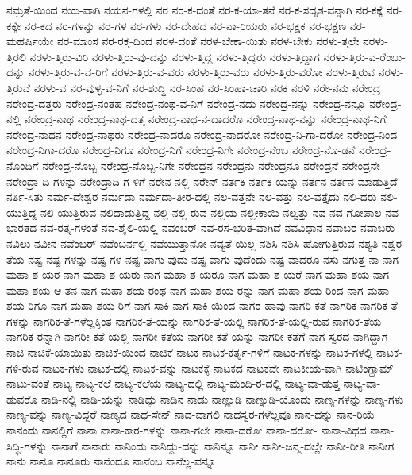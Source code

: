{ನಮ್ರತೆ-ಯಿಂದ
ನಯ-ವಾಗಿ
ನಯನ-ಗಳಲ್ಲಿ
ನರ
ನರ-ಕ-ದಂತೆ
ನರ-ಕ-ಯಾ-ತನೆ
ನರ-ಕ-ಸದೃಶ-ವನ್ನಾಗಿ
ನರ-ಕಕ್ಕೆ
ನರ-ಕಕ್ಕೇ
ನರ-ಕದ
ನರ-ಗಳನ್ನು
ನರ-ಗಳ
ನರ-ಗಳು
ನರ-ದೇಹದ
ನರ-ನಾ-ರಿಯರು
ನರ-ಭಕ್ಷಕ
ನರ-ಭಕ್ಷಣ
ನರ-ಮಹರ್ಷಿಯೇ
ನರ-ಮಾಂಸ
ನರ-ರಕ್ತ-ದಿಂದ
ನರಳ-ದಂತೆ
ನರಳ-ಬೇಕಾ-ಯಿತು
ನರಳ-ಬೇಕು
ನರಳು-ತ್ತಲೇ
ನರಳು-ತ್ತಿರಲಿ
ನರಳು-ತ್ತಿರು-ವಿರಿ
ನರಳು-ತ್ತಿರು-ವು-ದನ್ನು
ನರಳು-ತ್ತಿದ್ದ
ನರಳು-ತ್ತಿದ್ದರು
ನರಳು-ತ್ತಿದ್ದಾಗ
ನರಳು-ತ್ತಿರು-ವ-ರೆಂಬು-ದನ್ನು
ನರಳು-ತ್ತಿರು-ವ-ವ-ರಿಗೆ
ನರಳು-ತ್ತಿರು-ವ-ವರು
ನರಳು-ತ್ತಿರು-ವರು
ನರಳು-ತ್ತಿರು-ವರೋ
ನರಳು-ತ್ತಿರುವ
ನರಳು-ತ್ತಿರುವೆ
ನರಳು-ವ
ನರ-ವುಳ್ಳ-ವ-ನಿಗೆ
ನರ-ಶುದ್ಧಿ
ನರ-ಸಿಂಹ
ನರ-ಸಿಂಹಾ-ಚಾರಿ
ನರಕ
ನರಳಿ
ನರೇ-ನನು
ನರೇಂದ್ರ
ನರೇಂದ್ರ-ದತ್ತರು
ನರೇಂದ್ರ-ನಂತಹ
ನರೇಂದ್ರ-ನಂಥ-ವ-ನಿಗೆ
ನರೇಂದ್ರ-ನದು
ನರೇಂದ್ರ-ನನ್ನು
ನರೇಂದ್ರ-ನನ್ನೂ
ನರೇಂದ್ರ-ನಲ್ಲಿ
ನರೇಂದ್ರ-ನಾಥ
ನರೇಂದ್ರ-ನಾಥ-ದತ್ತ
ನರೇಂದ್ರ-ನಾಥ-ನ-ದಾದರೊ
ನರೇಂದ್ರ-ನಾಥ-ನನ್ನು
ನರೇಂದ್ರ-ನಾಥ-ನಿಗೆ
ನರೇಂದ್ರ-ನಾಥನ
ನರೇಂದ್ರ-ನಾಥರು
ನರೇಂದ್ರ-ನಾದರೊ
ನರೇಂದ್ರ-ನಾದರೋ
ನರೇಂದ್ರ-ನಿ-ಗಾ-ದರೋ
ನರೇಂದ್ರ-ನಿಂದ
ನರೇಂದ್ರ-ನಿಗಾ-ದರೊ
ನರೇಂದ್ರ-ನಿಗೂ
ನರೇಂದ್ರ-ನಿಗೆ
ನರೇಂದ್ರ-ನಿಗೇ
ನರೇಂದ್ರ-ನೆಂಬ
ನರೇಂದ್ರ-ನೊ-ಡನೆ
ನರೇಂದ್ರ-ನೊಂದಿಗೆ
ನರೇಂದ್ರ-ನೊಬ್ಬ
ನರೇಂದ್ರ-ನೊಬ್ಬ-ನಿಗೇ
ನರೇಂದ್ರನ
ನರೇಂದ್ರನು
ನರೇಂದ್ರನೂ
ನರೇಂದ್ರನೆ
ನರೇಂದ್ರನೇ
ನರೇಂದ್ರಾ-ದಿ-ಗಳನ್ನು
ನರೇಂದ್ರಾದಿ-ಗ-ಳಿಗೆ
ನರೇನ-ನಲ್ಲಿ
ನರೇನ್
ನರ್ತಕಿ
ನರ್ತಕಿ-ಯನ್ನು
ನರ್ತನ
ನರ್ತನ-ಮಾಡುತ್ತಿದೆ
ನರ್ತಿ-ಸಿತು
ನರ್ಮ-ದೇಶ್ವರ
ನರ್ಮದಾ
ನರ್ಮದಾ-ತೀರ-ದಲ್ಲಿ
ನಲ-ವತ್ತನೇ
ನಲ-ವತ್ತು
ನಲ-ವತ್ತೈದು
ನಲಿ-ದರು
ನಲಿ-ಯುತ್ತಿದ್ದ
ನಲಿ-ಯುತ್ತಿರುವ
ನಲಿದಾಡುತ್ತಿದ್ದ
ನಲ್ಲಿ
ನಲ್ಲಿ-ರುವ
ನಲ್ಲಿಯ
ನಲ್ಲೀಕಾಯಿ
ನಲ್ವತ್ತು
ನವ
ನವ-ಗೋಪಾಲ
ನವ-ಭಾರತದ
ನವ-ರತ್ನ-ಗಳಂತೆ
ನವ-ಶೈಲಿ-ಯಲ್ಲಿ
ನವಂಬರ್
ನವ-ರಸ-ಭರಿತ-ವಾಗಿದೆ
ನವವಿಧಾನ
ನವಾಬರ
ನವಾಬರು
ನವಿಲು
ನವೀನ
ನವೆಂಬರ್
ನವೆಂಬರ್ನಲ್ಲಿ
ನವೆಯುತ್ತಾನೋ
ನವ್ಯತೆ-ಯಿಲ್ಲ
ನಶಿಸಿ
ನಶಿಸಿ-ಹೋಗುತ್ತಿರುವ
ನಶ್ಯತಿ
ನಶ್ವರ-ತೆಯ
ನಷ್ಟ
ನಷ್ಟ-ಗಳನ್ನು
ನಷ್ಟ-ಗಳ
ನಷ್ಟ-ವಾಗು-ವುದು
ನಷ್ಟ-ವಾಗು-ವುದೆಂದು
ನಷ್ಟ-ವಾದರೂ
ನಸು-ನಗುತ್ತ
ನಾ
ನಾಗ-ಮಹಾ-ಶ-ಯರ
ನಾಗ-ಮಹಾ-ಶ-ಯರು
ನಾಗ-ಮಹಾ-ಶ-ಯರೂ
ನಾಗ-ಮಹಾ-ಶ-ಯರೆ
ನಾಗ-ಮಹಾ-ಶಯ
ನಾಗ-ಮಹಾ-ಶಯ-ಆ-ತನ
ನಾಗ-ಮಹಾ-ಶಯ-ರಂಥ
ನಾಗ-ಮಹಾ-ಶಯ-ರನ್ನು
ನಾಗ-ಮಹಾ-ಶಯ-ರಿಂದ
ನಾಗ-ಮಹಾ-ಶಯ-ರಿಗೂ
ನಾಗ-ಮಹಾ-ಶಯ-ರಿಗೆ
ನಾಗ-ಸಾಕಿ
ನಾಗ-ಸಾಕಿ-ಯಿಂದ
ನಾಗರ-ಹಾವು
ನಾಗರಿ-ಕತೆ
ನಾಗರಿಕ
ನಾಗರಿಕ-ತೆ-ಗಳನ್ನು
ನಾಗರಿಕ-ತೆ-ಗಳೆಲ್ಲಕ್ಕಿಂತ
ನಾಗರಿಕ-ತೆ-ಯನ್ನು
ನಾಗರಿಕ-ತೆ-ಯಲ್ಲಿ
ನಾಗರಿಕ-ತೆ-ಯಲ್ಲಿ-ರುವ
ನಾಗರಿಕ-ತೆಯ
ನಾಗರಿಕ-ರನ್ನಾಗಿ
ನಾಗರೀ-ಕತೆ-ಯಲ್ಲಿ
ನಾಗರೀ-ಕತೆಯ
ನಾಗರೀ-ಕತೆ-ಯನ್ನು
ನಾಗರೀ-ಕತೆಗೆ
ನಾಗ-ಸ್ವರದ
ನಾಗಿದ್ದಾಗ
ನಾಚಿ
ನಾಚಿಕೆ-ಯಾಯಿತು
ನಾಚಿಕೆ-ಯಿಂದ
ನಾಚಿಕೆ
ನಾಟಕ
ನಾಟಕ-ಕರ್ತೃ-ಗಳಿಗೆ
ನಾಟಕ-ಗಳನ್ನು
ನಾಟಕ-ಗಳಲ್ಲಿ
ನಾಟಕ-ಗಳಿ-ರುವ
ನಾಟಕ-ಗಳು
ನಾಟಕ-ದಲ್ಲಿ
ನಾಟಕ-ವನ್ನು
ನಾಟಕಕ್ಕೆ
ನಾಟಕದ
ನಾಟಕವೇ
ನಾಟಕೀಯ-ವಾಗಿ
ನಾಟಿಂಗ್ಹಾಮ್
ನಾಟು-ವಂತೆ
ನಾಟ್ಯ
ನಾಟ್ಯ-ಕಲೆ
ನಾಟ್ಯ-ಕಲೆಯ
ನಾಟ್ಯ-ದಲ್ಲಿ
ನಾಟ್ಯ-ಮಂದಿ-ರ-ದಲ್ಲಿ
ನಾಟ್ಯ-ವಾ-ಡುತ್ತ
ನಾಟ್ಯ-ವಾ-ಡುವರೊ
ನಾಡಿ-ನಲ್ಲಿ
ನಾಡಿ-ಯನ್ನು
ನಾಡಿದ್ದು
ನಾಡಿನ
ನಾಡು
ನಾಣ್ಣುಡಿ
ನಾಣ್ನುಡಿ-ಯೊಂದು
ನಾಣ್ಯ-ಗಳನ್ನು
ನಾಣ್ಯ-ಗಳು
ನಾಣ್ಯ-ವನ್ನು
ನಾಣ್ಯ-ವಿದ್ದರೆ
ನಾಣ್ಯದ
ನಾಥ-ಸೇನ್
ನಾದ-ವಾಗಲಿ
ನಾದಸ್ವರ-ಗಳೆಲ್ಲವೂ
ನಾನ-ದನ್ನು
ನಾನ-ರಿಯೆ
ನಾನಂದು
ನಾನಲ್ಲಿಗೆ
ನಾನಾ
ನಾನಾ-ಕಾರ-ಗಳನ್ನು
ನಾನಾ-ಗಲೇ
ನಾನಾ-ದರೋ
ನಾನಾ-ದರೋ-
ನಾನಾ-ವಿಧದ
ನಾನಾ-ಸಿದ್ಧಿ-ಗಳನ್ನು
ನಾನಾಗೆ
ನಾನಾರು
ನಾನಿಂದು
ನಾನಿದ್ದು-ದನ್ನು
ನಾನಿನ್ನೂ
ನಾನೀ
ನಾನೀ-ಜನ್ಮ-ದಲ್ಲೇ
ನಾನೀ-ರೀತಿ
ನಾನೀಗ
ನಾನು
ನಾನೂ
ನಾನೂರು
ನಾನೆಂದೂ
ನಾನೆಂಬ
ನಾನೆಲ್ಲ-ವನ್ನೂ
}
